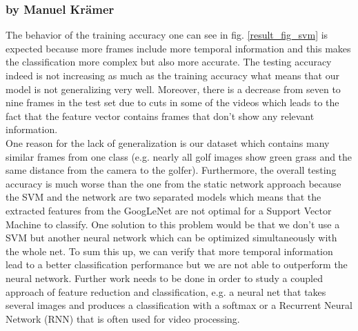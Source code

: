 \documentclass[11pt]{report}
\begin{document}
\subsubsection{by Manuel Krämer}
The behavior of the training accuracy one can see in fig. \ref{result_fig_svm} is expected because more frames include more temporal information and this makes the classification more complex but also more accurate. The testing accuracy indeed is not increasing as much as the training accuracy what means that our model is not generalizing very well. Moreover, there is a decrease from seven to nine frames in the test set due to cuts in some of the videos which leads to the fact that the feature vector contains frames that don't show any relevant information. \\
One reason for the lack of generalization is our dataset which contains many similar frames from one class (e.g. nearly all golf images show green grass and the same distance from the camera to the golfer). Furthermore, the overall testing accuracy is much worse than the one from the static network approach because the SVM and the network are two separated models which means that the extracted features from the GoogLeNet are not optimal for a Support Vector Machine to classify. One solution to this problem would be that we don't use a SVM but another neural network which can be optimized simultaneously with the whole net.
To sum this up, we can verify that more temporal information lead to a better classification performance but we are not able to outperform the neural network. Further work needs to be done in order to study a coupled approach of feature reduction and classification, e.g. a neural net that takes several images and produces a classification with a softmax or a Recurrent Neural Network (RNN) that is often used for video processing.



\end{document}
